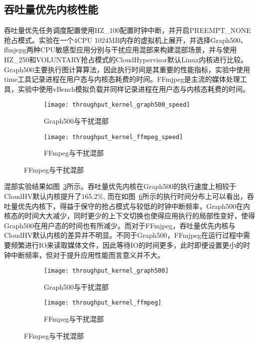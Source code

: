 \subsection{吞吐量优先内核性能}


吞吐量优先任务调度配置使用HZ\_100配置时钟中断，并开启PREEMPT\_NONE抢占模式。实验在一个4CPU 1024MB内存的虚拟机上展开，并选择Graph500、ffmjepg两种CPU敏感型应用分别与干扰应用混部来构建混部场景，并与使用HZ\_250和VOLUNTARY抢占模式的CloudHypervisor默认Linux内核进行比较。Graph500主要执行图计算算法，因此执行时间是其重要的性能指标，实验中使用time工具记录进程在用户态与内核态耗费的时间。FFmjpeg是主流的媒体处理工具，实验中使用vBench模拟负载并同样记录进程在用户态与内核态耗费的时间。

\begin{figure}[H]
    \centering
    \begin{subfigure}[b]{0.32\textwidth}
        \texttt{[image: throughput\_kernel\_graph500\_speed]}
        \caption{\quad Graph500与干扰混部}
        \label{fig:throughput_kernel_graph500_speed}
    \end{subfigure}
    \begin{subfigure}[b]{0.32\textwidth}
        \texttt{[image: throughput\_kernel\_ffmpeg\_speed]}
        \caption{\quad FFmpeg与干扰混部}
        \label{fig:throughput_kernel_ffmpeg_speed}
    \end{subfigure}
    \label{fig:perf_throughput}
\end{figure}

混部实验结果如图~\ref{fig:perf_throughput}所示。吞吐量优先内核在Graph500的执行速度上相较于CloudHV默认内核提升了165.2\%, 而在如图~\ref{fig:perf_throughput_time}所示的执行时间分布上可以看出，吞吐量优先内核下，得益于保守的抢占模式与较低的时钟中断频率，Graph500在内核态的时间大大减少，同时更少的上下文切换也使得应用执行的局部性变好，使得Graph500在用户态的时间也有所减少。而对于FFmjpeg，吞吐量优先内核与CloudHV默认内核的差异并不明显。不同于Graph500，FFmjpeg在运行过程中需要频繁进行IO来读取媒体文件，因此等待IO的时间更多，此时即便设置更小的时钟中断频率，但对于提升应用性能而言意义并不大。

\begin{figure}[H]
    \centering
    \begin{subfigure}[b]{0.32\textwidth}
        \texttt{[image: throughput\_kernel\_graph500]}
        \caption{\quad Graph500与干扰混部}
        \label{fig:throughput_kernel_graph500}
    \end{subfigure}
    \begin{subfigure}[b]{0.32\textwidth}
        \texttt{[image: throughput\_kernel\_ffmpeg]}
        \caption{\quad FFmpeg与干扰混部}
        \label{fig:throughput_kernel_ffmpeg}
    \end{subfigure}
    \label{fig:perf_throughput_time}
\end{figure}

